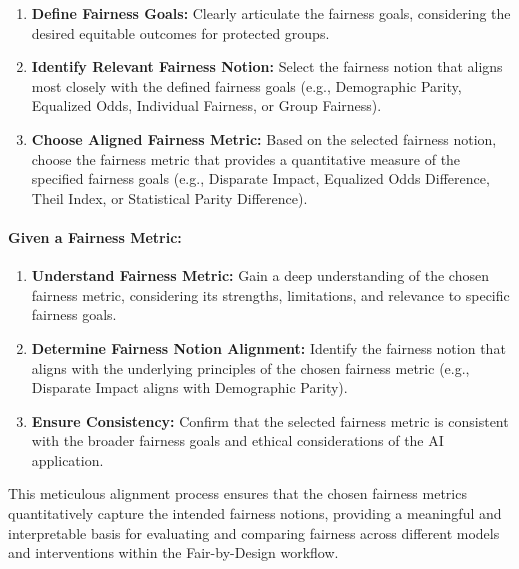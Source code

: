 \begin{enumerate}
 
    \item \textbf{Define Fairness Goals:} Clearly articulate the fairness goals, considering the desired equitable outcomes for protected groups.
 
    \item \textbf{Identify Relevant Fairness Notion:} Select the fairness notion that aligns most closely with the defined fairness goals (e.g., Demographic Parity, Equalized Odds, Individual Fairness, or Group Fairness).
 
    \item \textbf{Choose Aligned Fairness Metric:} Based on the selected fairness notion, choose the fairness metric that provides a quantitative measure of the specified fairness goals (e.g., Disparate Impact, Equalized Odds Difference, Theil Index, or Statistical Parity Difference).

\end{enumerate}

\paragraph{Given a Fairness Metric:}

\begin{enumerate}

    \item \textbf{Understand Fairness Metric:} Gain a deep understanding of the chosen fairness metric, considering its strengths, limitations, and relevance to specific fairness goals.

    \item \textbf{Determine Fairness Notion Alignment:} Identify the fairness notion that aligns with the underlying principles of the chosen fairness metric (e.g., Disparate Impact aligns with Demographic Parity).
 
    \item \textbf{Ensure Consistency:} Confirm that the selected fairness metric is consistent with the broader fairness goals and ethical considerations of the AI application.

\end{enumerate}

This meticulous alignment process ensures that the chosen fairness metrics quantitatively capture the intended fairness notions, providing a meaningful and interpretable basis for evaluating and comparing fairness across different models and interventions within the Fair-by-Design workflow.

